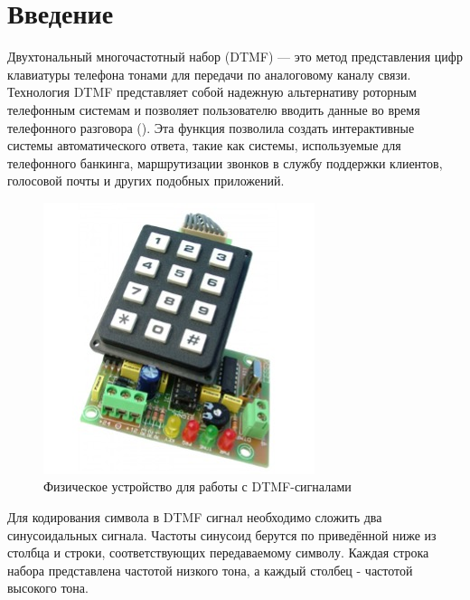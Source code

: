 \chapter*{Введение} %

Двухтональный многочастотный набор (DTMF) — это метод представления цифр клавиатуры телефона тонами для передачи по аналоговому каналу связи. Технология DTMF представляет собой надежную альтернативу роторным телефонным системам и позволяет пользователю вводить данные во время телефонного разговора (). Эта функция позволила создать интерактивные системы автоматического ответа, такие как системы, используемые для телефонного банкинга, маршрутизации звонков в службу поддержки клиентов, голосовой почты и других подобных приложений.

\begin{figure}[ht] 
	\center
	\includegraphics [scale=0.7] {my_folder/images/dtmf}
	\caption{Физическое устройство для работы с DTMF-сигналами} 
	\label{fig:dtmf}
	\end{figure}

Для кодирования символа в DTMF сигнал необходимо сложить два синусоидальных сигнала. Частоты синусоид берутся по приведённой ниже  из столбца и строки, соответствующих передаваемому символу. Каждая строка набора представлена частотой низкого тона, а каждый столбец - частотой высокого тона.

